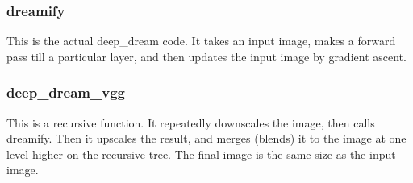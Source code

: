 \documentclass[11pt]{article}
\begin{document}
\subsubsection{dreamify}\label{dreamify}

This is the actual deep\_dream code. It takes an input image, makes a
forward pass till a particular layer, and then updates the input image
by gradient ascent.

\subsubsection{deep\_dream\_vgg}\label{deep_dream_vgg}

This is a recursive function. It repeatedly downscales the image, then
calls dreamify. Then it upscales the result, and merges (blends) it to
the image at one level higher on the recursive tree. The final image is
the same size as the input image.
\end{document}
